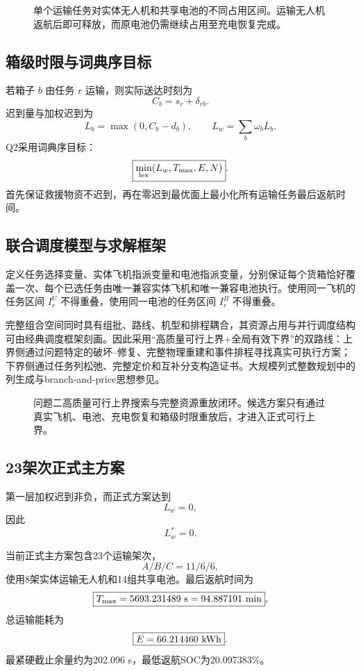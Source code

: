 \documentclass[UTF8,a4paper,12pt]{ctexart}
\begin{document}
\begin{figure}[H]
  \centering
  \resizebox{0.88\textwidth}{!}{\QTwoFigOccupancy}
  \caption{单个运输任务对实体无人机和共享电池的不同占用区间。运输无人机返航后即可释放，而原电池仍需继续占用至充电恢复完成。}
  \label{fig:q2_resource_occupancy_v7}
\end{figure}

\subsection{箱级时限与词典序目标}

若箱子 $b$ 由任务 $r$ 运输，则实际送达时刻为
\[
C_b=s_r+\delta_{rb}.
\]
迟到量与加权迟到为
\[
L_b=\max(0,C_b-d_b),
\qquad
L_w=\sum_b\omega_bL_b.
\]
Q2采用词典序目标：
\[
\boxed{
\min_{\rm lex}(L_w,T_{\max},E,N)
}.
\]
首先保证救援物资不迟到，再在零迟到最优面上最小化所有运输任务最后返航时间。

\subsection{联合调度模型与求解框架}

定义任务选择变量、实体飞机指派变量和电池指派变量，分别保证每个货箱恰好覆盖一次、每个已选任务由唯一兼容实体飞机和唯一兼容电池执行。使用同一飞机的任务区间 $I_r^U$ 不得重叠，使用同一电池的任务区间 $I_r^B$ 不得重叠。

完整组合空间同时具有组批、路线、机型和排程耦合，其资源占用与并行调度结构可由经典调度框架刻画\cite{pinedo2016scheduling}。因此采用“高质量可行上界+全局有效下界”的双路线：上界侧通过问题特定的破坏--修复、完整物理重建和事件排程寻找真实可执行方案；下界侧通过任务列松弛、完整定价和互补分支构造证书。大规模列式整数规划中的列生成与branch-and-price思想参见\cite{barnhart1998branchprice}。

\begin{figure}[H]
  \centering
  \resizebox{0.88\textwidth}{!}{\QTwoFigUpperSearch}
  \caption{问题二高质量可行上界搜索与完整资源重放闭环。候选方案只有通过真实飞机、电池、充电恢复和箱级时限重放后，才进入正式可行上界。}
  \label{fig:q2_upper_search_v7}
\end{figure}

\subsection{23架次正式主方案}

第一层加权迟到非负，而正式方案达到
\[
L_w=0,
\]
因此
\[
\boxed{L_w^*=0}.
\]

当前正式主方案包含23个运输架次，
\[
A/B/C=11/6/6,
\]
使用8架实体运输无人机和14组共享电池。最后返航时间为
\[
\boxed{
T_{\max}=5693.231489\ {\rm s}
=94.887191\ {\rm min}
},
\]
总运输能耗为
\[
\boxed{
E=66.214460\ {\rm kWh}
}.
\]
最紧硬截止余量约为202.096 s，最低返航SOC为20.097383\%。
\end{document}
